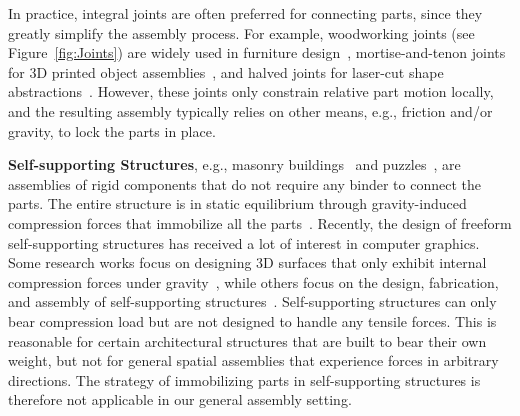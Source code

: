 In practice, integral joints are often preferred for connecting parts, since they greatly simplify the assembly process. For example, woodworking joints (see Figure~\ref{fig:Joints}) are widely used in furniture design~\cite{Yao-2017-DecorativeJoinery,Koo-2017-ZeroWaste,Chen-2015-FreshPressModeler,Schwartzburg-2013-PlanarPieces},
mortise-and-tenon joints for 3D printed object assemblies~\cite{Luo-2012-Chopper, Hao-2011-PartitionModels, Duncan-2016-Hands-OnAssembly}, and
halved joints for laser-cut shape abstractions~\cite{Cignoni-2014-MeshJoinery,  Hildebrand-2012-crdbrd,McCrae-2011-Slices}.
However, these joints only constrain relative part motion locally, and the resulting assembly typically relies on other means, e.g., friction and/or gravity, to lock the parts in place.


\vspace*{2.0mm}
\noindent
{\bf Self-supporting Structures},  
e.g., masonry buildings~\cite{Rippmann-2016-ArmadilloVault} and puzzles~\cite{Frick-2015-Self-SupportPuzzle}, are assemblies of rigid components that do not require any binder to connect the parts. The entire structure is in static equilibrium through gravity-induced compression forces that immobilize all the parts~\cite{Whiting-2009-ModelMasonry}.
%
Recently, the design of freeform self-supporting structures has  received a lot of interest in computer graphics.
Some research works focus on designing 3D surfaces that only exhibit internal compression forces under gravity~\cite{Miki-2015-AiryStressFunctions,Tang-2014-PolyhedralMesh,Liu-2013-RegularTriangulation,deGoes-2013-Equilibrium,Vouga-2012-Self-SupportSurface},
while others focus on the design, fabrication, and assembly of self-supporting structures~\cite{Rippmann-2016-ArmadilloVault,Deuss-2014-AssembleSelfSupport,Panozzo-2013-SelfSupportMasonry}.  
%
Self-supporting structures can only bear compression load but are not designed to handle any tensile forces.
This is reasonable for certain architectural structures that are built to bear their own weight, but not for general spatial assemblies that experience forces in arbitrary directions. The strategy of immobilizing parts in self-supporting structures is therefore not applicable in our general assembly setting.





